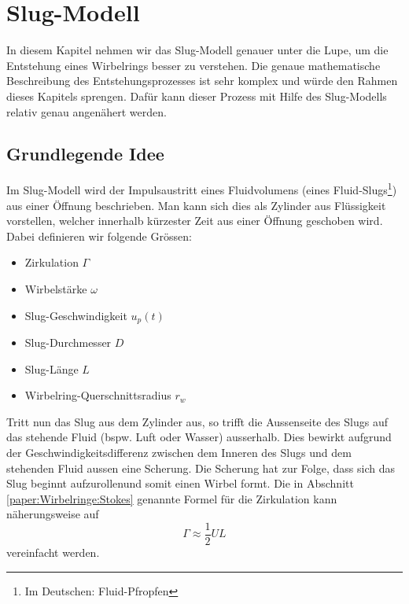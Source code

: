%
%
%
\section{Slug-Modell}
In diesem Kapitel nehmen wir das Slug-Modell genauer unter die Lupe, um die Entstehung eines Wirbelrings besser zu verstehen.
Die genaue mathematische Beschreibung des Entstehungsprozesses ist sehr komplex und würde den Rahmen dieses Kapitels sprengen.
Dafür kann dieser Prozess mit Hilfe des Slug-Modells relativ genau angenähert werden.

\subsection{Grundlegende Idee}
Im Slug-Modell wird der Impulsaustritt eines Fluidvolumens (eines Fluid-Slugs\footnote{Im Deutschen: Fluid-Pfropfen}) aus einer Öffnung beschrieben.
Man kann sich dies als Zylinder aus Flüssigkeit vorstellen, welcher innerhalb kürzester Zeit aus einer Öffnung geschoben wird.
Dabei definieren wir folgende Grössen:
\begin{itemize}
    \item Zirkulation $\Gamma$
    \item Wirbelstärke $\omega$
    \item Slug-Geschwindigkeit $u_p(t)$
    \item Slug-Durchmesser $D$
    \item Slug-Länge $L$
    \item Wirbelring-Querschnittsradius $r_w$
\end{itemize}



Tritt nun das Slug aus dem Zylinder aus, so trifft die Aussenseite des Slugs auf das stehende Fluid (bspw. Luft oder Wasser) ausserhalb.
Dies bewirkt aufgrund der Geschwindigkeitsdifferenz zwischen dem Inneren des Slugs und dem stehenden Fluid aussen eine Scherung.
Die Scherung hat zur Folge, dass sich das Slug beginnt \glqq aufzurollen\grqq und somit einen Wirbel formt. 
Die in Abschnitt \ref{paper:Wirbelringe:Stokes} genannte Formel für die Zirkulation kann näherungsweise auf
\begin{equation*}
\Gamma 
\approx 
\frac{1}{2}UL
\end{equation*}
vereinfacht werden.

